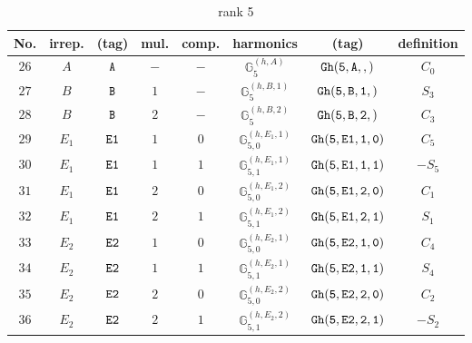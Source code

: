 \documentclass[fleqn,8pt]{jsarticle}
\begin{document}
\begin{table}[ht!]
\begin{center}
\caption{rank 5}
\renewcommand{\arraystretch}{1.3}
\begin{tabular}{cccccccc} \hline \hline
No. & irrep. & (tag) & mul. & comp. & harmonics & (tag) & definition \\ \hline
$ 26 $ & $ A $ & $ {\tt A} $ & $ - $ & $ - $ & $ \mathbb{G}_{5}^{(h,A)} $ & $ {\tt Gh(5,A,,)} $ & $ C_{0} $ \\
$ 27 $ & $ B $ & $ {\tt B} $ & $ 1 $ & $ - $ & $ \mathbb{G}_{5}^{(h,B,1)} $ & $ {\tt Gh(5,B,1,)} $ & $ S_{3} $ \\
$ 28 $ & $ B $ & $ {\tt B} $ & $ 2 $ & $ - $ & $ \mathbb{G}_{5}^{(h,B,2)} $ & $ {\tt Gh(5,B,2,)} $ & $ C_{3} $ \\
$ 29 $ & $ E_{1} $ & $ {\tt E1} $ & $ 1 $ & $ 0 $ & $ \mathbb{G}_{5,0}^{(h,E_{1},1)} $ & $ {\tt Gh(5,E1,1,0)} $ & $ C_{5} $ \\
$ 30 $ & $ E_{1} $ & $ {\tt E1} $ & $ 1 $ & $ 1 $ & $ \mathbb{G}_{5,1}^{(h,E_{1},1)} $ & $ {\tt Gh(5,E1,1,1)} $ & $ - S_{5} $ \\
$ 31 $ & $ E_{1} $ & $ {\tt E1} $ & $ 2 $ & $ 0 $ & $ \mathbb{G}_{5,0}^{(h,E_{1},2)} $ & $ {\tt Gh(5,E1,2,0)} $ & $ C_{1} $ \\
$ 32 $ & $ E_{1} $ & $ {\tt E1} $ & $ 2 $ & $ 1 $ & $ \mathbb{G}_{5,1}^{(h,E_{1},2)} $ & $ {\tt Gh(5,E1,2,1)} $ & $ S_{1} $ \\
$ 33 $ & $ E_{2} $ & $ {\tt E2} $ & $ 1 $ & $ 0 $ & $ \mathbb{G}_{5,0}^{(h,E_{2},1)} $ & $ {\tt Gh(5,E2,1,0)} $ & $ C_{4} $ \\
$ 34 $ & $ E_{2} $ & $ {\tt E2} $ & $ 1 $ & $ 1 $ & $ \mathbb{G}_{5,1}^{(h,E_{2},1)} $ & $ {\tt Gh(5,E2,1,1)} $ & $ S_{4} $ \\
$ 35 $ & $ E_{2} $ & $ {\tt E2} $ & $ 2 $ & $ 0 $ & $ \mathbb{G}_{5,0}^{(h,E_{2},2)} $ & $ {\tt Gh(5,E2,2,0)} $ & $ C_{2} $ \\
$ 36 $ & $ E_{2} $ & $ {\tt E2} $ & $ 2 $ & $ 1 $ & $ \mathbb{G}_{5,1}^{(h,E_{2},2)} $ & $ {\tt Gh(5,E2,2,1)} $ & $ - S_{2} $ \\
 \hline \hline
\end{tabular}
\end{center}
\end{table}
\end{document}
